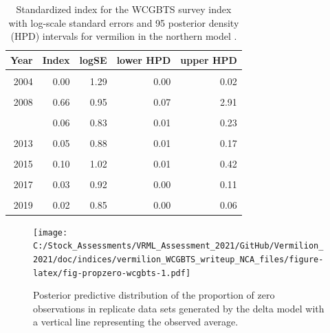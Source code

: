 \documentclass[
  english,
  a4paper,
]{article}
\begin{document}
\begin{table}

\caption{\label{tab:tab-index-wcgbts}Standardized index for the WCGBTS survey index with log-scale standard errors and 95%
       posterior density (HPD) intervals for vermilion in the northern model .}
\centering
\begin{tabular}[t]{rrrrr}
\toprule
Year & Index & logSE & lower HPD & upper HPD\\
\midrule
\cellcolor{gray!6}{2003} & \cellcolor{gray!6}{0.20} & \cellcolor{gray!6}{1.08} & \cellcolor{gray!6}{0.01} & \cellcolor{gray!6}{0.91}\\
2004 & 0.00 & 1.29 & 0.00 & 0.02\\
\cellcolor{gray!6}{2006} & \cellcolor{gray!6}{0.39} & \cellcolor{gray!6}{1.41} & \cellcolor{gray!6}{0.01} & \cellcolor{gray!6}{2.23}\\
2008 & 0.66 & 0.95 & 0.07 & 2.91\\
\cellcolor{gray!6}{2009} & \cellcolor{gray!6}{0.33} & \cellcolor{gray!6}{1.44} & \cellcolor{gray!6}{0.01} & \cellcolor{gray!6}{1.89}\\
\addlinespace
2010 & 0.06 & 0.83 & 0.01 & 0.23\\
\cellcolor{gray!6}{2012} & \cellcolor{gray!6}{0.13} & \cellcolor{gray!6}{0.93} & \cellcolor{gray!6}{0.01} & \cellcolor{gray!6}{0.48}\\
2013 & 0.05 & 0.88 & 0.01 & 0.17\\
\cellcolor{gray!6}{2014} & \cellcolor{gray!6}{0.07} & \cellcolor{gray!6}{1.37} & \cellcolor{gray!6}{0.00} & \cellcolor{gray!6}{0.36}\\
2015 & 0.10 & 1.02 & 0.01 & 0.42\\
\addlinespace
\cellcolor{gray!6}{2016} & \cellcolor{gray!6}{0.21} & \cellcolor{gray!6}{0.83} & \cellcolor{gray!6}{0.03} & \cellcolor{gray!6}{0.75}\\
2017 & 0.03 & 0.92 & 0.00 & 0.11\\
\cellcolor{gray!6}{2018} & \cellcolor{gray!6}{0.01} & \cellcolor{gray!6}{0.99} & \cellcolor{gray!6}{0.00} & \cellcolor{gray!6}{0.05}\\
2019 & 0.02 & 0.85 & 0.00 & 0.06\\
\bottomrule
\end{tabular}
\end{table}

\FloatBarrier

\begin{figure}
\centering
\texttt{[image: C:/Stock\_Assessments/VRML\_Assessment\_2021/GitHub/Vermilion\_2021/doc/indices/vermilion\_WCGBTS\_writeup\_NCA\_files/figure-latex/fig-propzero-wcgbts-1.pdf]}
\caption{\label{fig:fig-propzero-wcgbts}Posterior predictive distribution of the proportion of zero observations in replicate data sets generated by the delta model with a vertical line representing the observed average.}
\end{figure}
\end{document}
